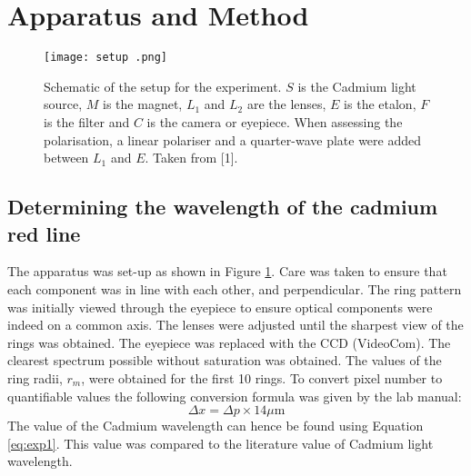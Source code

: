 \documentclass[11pt,twocolumn, a4paper]{article}
\numberwithin{equation}{section} %
\numberwithin{figure}{section} %
\numberwithin{table}{section} %
\begin{document}
\section{Apparatus and Method}
\begin{figure}[H]
    \centering
    \texttt{[image: setup .png]}
    \caption{Schematic of the setup for the experiment. \(S\) is the Cadmium light source, $M$ is the magnet, $L_1$ and $L_2$ are the lenses, $E$ is the etalon, $F$ is the filter and $C$ is the camera or eyepiece. When assessing the polarisation, a linear polariser and a quarter-wave plate were added between $L_1$ and $E$. Taken from [1].}
    \label{fig:apparatus}
\end{figure}
\subsection{Determining the wavelength of the cadmium red line}
The apparatus was set-up as shown in Figure \ref{fig:apparatus}. Care was taken to ensure that each component was in line with each other, and perpendicular. The ring pattern was initially viewed through the eyepiece to ensure optical components were indeed on a common axis. The lenses were adjusted until the sharpest view of the rings was obtained. The eyepiece was replaced with the CCD (VideoCom). The clearest spectrum possible without saturation was obtained. The values of the ring radii, \(r_m\),  were obtained for the first 10 rings. To convert pixel number to quantifiable values the following conversion formula was given by the lab manual: 
\begin{equation}\label{eq:conversion}
    \Delta x = \Delta p \times 14 \mu\text{m}
\end{equation}
The value of the Cadmium wavelength can hence be found using Equation \eqref{eq:exp1}. This value was compared to the literature value of Cadmium light wavelength. 
\end{document}
